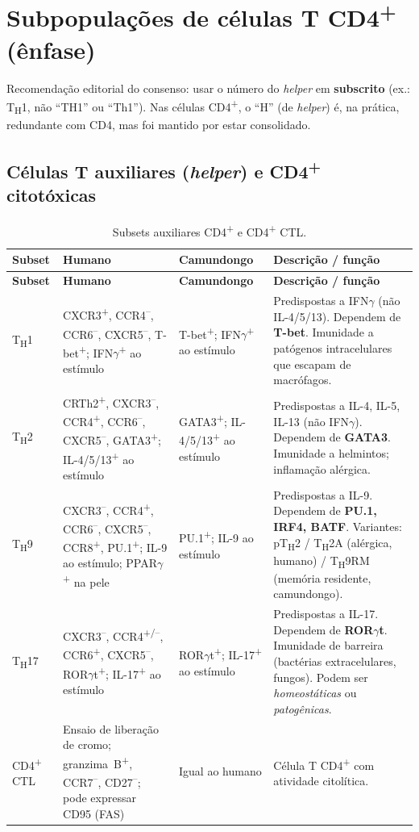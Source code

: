 \documentclass[11pt,a4paper]{article}
\newcommand{\up}[1]{\textsuperscript{#1}}          %
\newcommand{\tc}[1]{T\textsubscript{#1}}           %
\newcommand{\ifng}{IFN\ensuremath{\gamma}}
\newcommand{\rort}{ROR\ensuremath{\gamma}t}
\begin{document}
\section{Subpopulações de células T CD4\texorpdfstring{\up{+}}{+} (ênfase)}
\label{sec:cd4}
Recomendação editorial do consenso: usar o número do \emph{helper} em \textbf{subscrito}
(ex.: \tc{H}1, não ``TH1'' ou ``Th1''). Nas células CD4\up{+}, o ``H'' (de \emph{helper}) é,
na prática, redundante com CD4, mas foi mantido por estar consolidado.

\subsection{Células T auxiliares (\emph{helper}) e CD4\up{+} citotóxicas}
\renewcommand{\arraystretch}{1.3}
\small
\begin{longtable}{L{1.7cm} L{5.4cm} L{3.3cm} L{4.4cm}}
\caption{Subsets auxiliares CD4\up{+} e CD4\up{+} CTL.}\label{tab:helper}\\
\toprule
\textbf{Subset} & \textbf{Humano} & \textbf{Camundongo} & \textbf{Descrição / função} \\
\midrule
\endfirsthead
\toprule
\textbf{Subset} & \textbf{Humano} & \textbf{Camundongo} & \textbf{Descrição / função} \\
\midrule
\endhead
\bottomrule
\endfoot
\tc{H}1 &
CXCR3\up{+}, CCR4\up{--}, CCR6\up{--}, CXCR5\up{--}, T-bet\up{+}; \ifng{}\up{+} ao estímulo &
T-bet\up{+}; \ifng{}\up{+} ao estímulo &
Predispostas a \ifng{} (não IL-4/5/13). Dependem de \textbf{T-bet}. Imunidade a patógenos
intracelulares que escapam de macrófagos. \\
\tc{H}2 &
CRTh2\up{+}, CXCR3\up{--}, CCR4\up{+}, CCR6\up{--}, CXCR5\up{--}, GATA3\up{+};
IL-4/5/13\up{+} ao estímulo &
GATA3\up{+}; IL-4/5/13\up{+} ao estímulo &
Predispostas a IL-4, IL-5, IL-13 (não \ifng{}). Dependem de \textbf{GATA3}. Imunidade a
helmintos; inflamação alérgica. \\
\tc{H}9 &
CXCR3\up{--}, CCR4\up{+}, CCR6\up{--}, CXCR5\up{--}, CCR8\up{+}, PU.1\up{+}; IL-9 ao estímulo;
PPAR\ensuremath{\gamma}\up{+} na pele &
PU.1\up{+}; IL-9 ao estímulo &
Predispostas a IL-9. Dependem de \textbf{PU.1, IRF4, BATF}. Variantes: p\tc{H}2 /
\tc{H}2A (alérgica, humano) / \tc{H}9RM (memória residente, camundongo). \\
\tc{H}17 &
CXCR3\up{--}, CCR4\up{+/--}, CCR6\up{+}, CXCR5\up{--}, \rort{}\up{+}; IL-17\up{+} ao estímulo &
\rort{}\up{+}; IL-17\up{+} ao estímulo &
Predispostas a IL-17. Dependem de \textbf{\rort{}}. Imunidade de barreira (bactérias
extracelulares, fungos). Podem ser \emph{homeostáticas} ou \emph{patogênicas}. \\
CD4\up{+} CTL &
Ensaio de liberação de cromo; granzima~B\up{+}, CCR7\up{--}, CD27\up{--}; pode expressar
CD95 (FAS) & Igual ao humano &
Célula T CD4\up{+} com atividade citolítica. \\
\end{longtable}
\normalsize
\end{document}
